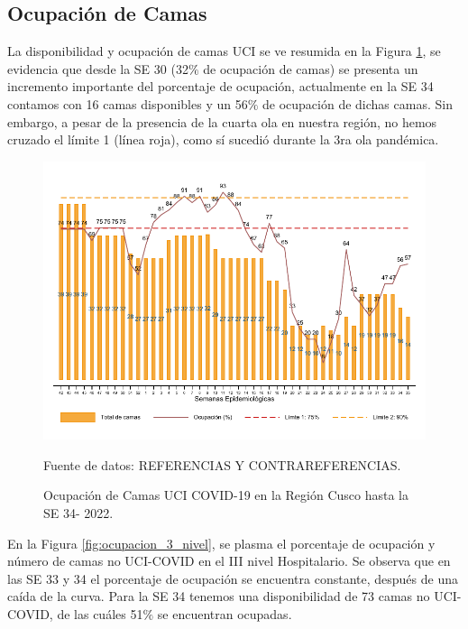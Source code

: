 \documentclass[12pt,a4paper,openany]{book}
\begin{document}
	\clearpage
	\subsection*{Ocupación de Camas}
	\noindent La disponibilidad y ocupación de camas UCI se ve resumida en la Figura \ref{fig:ocupacion_uci}, se evidencia que desde la SE 30 (32$\%$ de ocupación de camas) se presenta un incremento importante del porcentaje de ocupación, actualmente en la SE 34 contamos con 16 camas disponibles y un 56$\%$ de ocupación de dichas camas. Sin embargo, a pesar de la presencia de la cuarta ola en nuestra región, no hemos cruzado el límite 1 (línea roja), como sí sucedió durante la 3ra ola pandémica.
	
	\begin{figure}[h]
		\caption{Ocupación de Camas UCI COVID-19 en la Región Cusco hasta la SE 34- 2022.}\label{fig:ocupacion_uci}
		\begin{center}
			\includegraphics[width=0.95\linewidth]{../figuras/uci.pdf}
		\end{center}
		{\footnotesize {Fuente de datos: REFERENCIAS Y CONTRAREFERENCIAS.}}
	\end{figure}
	\cleardoublepage
	
	En la Figura \ref{fig:ocupacion_3_nivel}, se plasma el porcentaje de ocupación y número de camas no UCI-COVID en el III nivel Hospitalario. Se observa que en las SE 33 y 34 el porcentaje de ocupación se encuentra constante, después de una caída de la curva. Para la SE 34  tenemos una disponibilidad de 73 camas no UCI-COVID, de las cuáles 51$\%$ se encuentran ocupadas.
	
\end{document}
